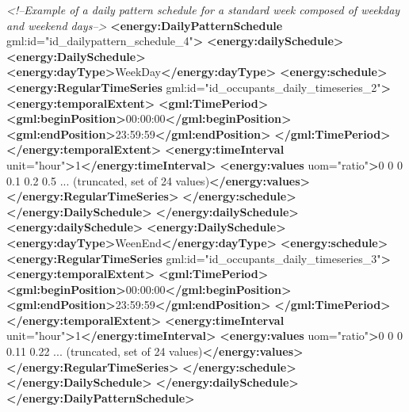 \documentclass[a4paper,12pt]{article}
\newenvironment{Shaded}{}{}
\newcommand{\KeywordTok}[1]{\textcolor[rgb]{0.00,0.44,0.13}{\textbf{{#1}}}}
\newcommand{\StringTok}[1]{\textcolor[rgb]{0.25,0.44,0.63}{{#1}}}
\newcommand{\CommentTok}[1]{\textcolor[rgb]{0.38,0.63,0.69}{\textit{{#1}}}}
\newcommand{\OtherTok}[1]{\textcolor[rgb]{0.00,0.44,0.13}{{#1}}}
\newcommand{\NormalTok}[1]{{#1}}
\begin{document}
\begin{Shaded}
\begin{Highlighting}[]
\CommentTok{<!--Example of a daily pattern schedule for a standard week composed of weekday and weekend days-->}
\KeywordTok{<energy:DailyPatternSchedule}\OtherTok{ gml:id=}\StringTok{"id_dailypattern_schedule_4"}\KeywordTok{>}
    \KeywordTok{<energy:dailySchedule>}
        \KeywordTok{<energy:DailySchedule>}
            \KeywordTok{<energy:dayType>}\NormalTok{WeekDay}\KeywordTok{</energy:dayType>}
            \KeywordTok{<energy:schedule>}
                \KeywordTok{<energy:RegularTimeSeries}\OtherTok{ gml:id=}\StringTok{"id_occupants_daily_timeseries_2"}\KeywordTok{>}
                    \KeywordTok{<energy:temporalExtent>}
                        \KeywordTok{<gml:TimePeriod>}
                            \KeywordTok{<gml:beginPosition>}\NormalTok{00:00:00}\KeywordTok{</gml:beginPosition>}
                            \KeywordTok{<gml:endPosition>}\NormalTok{23:59:59}\KeywordTok{</gml:endPosition>}
                        \KeywordTok{</gml:TimePeriod>}
                    \KeywordTok{</energy:temporalExtent>}
                    \KeywordTok{<energy:timeInterval}\OtherTok{ unit=}\StringTok{"hour"}\KeywordTok{>}\NormalTok{1}\KeywordTok{</energy:timeInterval>}
                    \KeywordTok{<energy:values}\OtherTok{ uom=}\StringTok{"ratio"}\KeywordTok{>}\NormalTok{0 0 0 0.1 0.2 0.5 ... (truncated, set of 24 values)}\KeywordTok{</energy:values>}
                \KeywordTok{</energy:RegularTimeSeries>}
            \KeywordTok{</energy:schedule>}
        \KeywordTok{</energy:DailySchedule>}
    \KeywordTok{</energy:dailySchedule>}
    \KeywordTok{<energy:dailySchedule>}
        \KeywordTok{<energy:DailySchedule>}
            \KeywordTok{<energy:dayType>}\NormalTok{WeenEnd}\KeywordTok{</energy:dayType>}
            \KeywordTok{<energy:schedule>}
                \KeywordTok{<energy:RegularTimeSeries}\OtherTok{ gml:id=}\StringTok{"id_occupants_daily_timeseries_3"}\KeywordTok{>}
                    \KeywordTok{<energy:temporalExtent>}
                        \KeywordTok{<gml:TimePeriod>}
                            \KeywordTok{<gml:beginPosition>}\NormalTok{00:00:00}\KeywordTok{</gml:beginPosition>}
                            \KeywordTok{<gml:endPosition>}\NormalTok{23:59:59}\KeywordTok{</gml:endPosition>}
                        \KeywordTok{</gml:TimePeriod>}
                    \KeywordTok{</energy:temporalExtent>}
                    \KeywordTok{<energy:timeInterval}\OtherTok{ unit=}\StringTok{"hour"}\KeywordTok{>}\NormalTok{1}\KeywordTok{</energy:timeInterval>}
                    \KeywordTok{<energy:values}\OtherTok{ uom=}\StringTok{"ratio"}\KeywordTok{>}\NormalTok{0 0 0 0.11 0.22 ... (truncated, set of 24 values)}\KeywordTok{</energy:values>}
                \KeywordTok{</energy:RegularTimeSeries>}
            \KeywordTok{</energy:schedule>}
        \KeywordTok{</energy:DailySchedule>}
    \KeywordTok{</energy:dailySchedule>}
\KeywordTok{</energy:DailyPatternSchedule>}
\end{Highlighting}
\end{Shaded}
\end{document}
